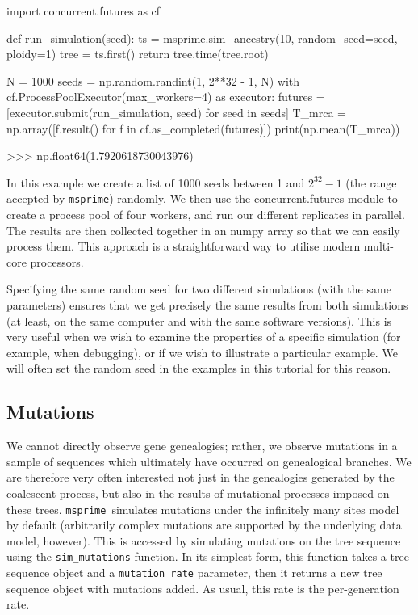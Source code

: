 \documentclass[graybox]{svmult}
\newcommand{\msprime}[0]{\texttt{msprime}}
\begin{document}
\begin{pythoncode}
import concurrent.futures as cf

def run_simulation(seed):
    ts = msprime.sim_ancestry(10, random_seed=seed, ploidy=1)
    tree = ts.first()
    return tree.time(tree.root)

N = 1000
seeds = np.random.randint(1, 2**32 - 1, N)
with cf.ProcessPoolExecutor(max_workers=4) as executor:
     futures = [executor.submit(run_simulation, seed)
                for seed in seeds]
     T_mrca = np.array([f.result()
                        for f in cf.as_completed(futures)])
print(np.mean(T_mrca))

>>> np.float64(1.7920618730043976)
\end{pythoncode}

    In this example we create a list of 1000 seeds between 1 and $2^{32} -
1$ (the range accepted by \msprime) randomly. We then use the
concurrent.futures module to create a process pool of four workers, and
run our different replicates in parallel. The results are then
collected together in an numpy array so that we can easily process them.
This approach is a straightforward way to utilise modern
multi-core processors.

Specifying the same random seed for two different simulations (with the
same parameters) ensures that we get precisely the same results from
both simulations (at least, on the same computer and with the same
software versions). This is very useful when we wish to examine the
properties of a specific simulation (for example, when debugging), or if
we wish to illustrate a particular example. We will often set the random
seed in the examples in this tutorial for this reason.

\subsection{Mutations}\label{mutations}

We cannot directly observe gene genealogies; rather, we observe mutations in a sample of sequences which ultimately have occurred on genealogical branches. We are
therefore very often interested not just in the genealogies generated by the coalescent process, but also in the results of
mutational processes imposed on these trees. \msprime\ simulates mutations under the infinitely many sites model by default
(arbitrarily complex mutations are supported by the underlying data model, however). This is
accessed by simulating mutations on the tree sequence using the \texttt{sim\_mutations} function. In its simplest form, this function takes
a tree sequence object and a \texttt{mutation\_rate} parameter, then it returns a new tree sequence object with mutations added.
As usual, this rate is the per-generation rate.
\end{document}
